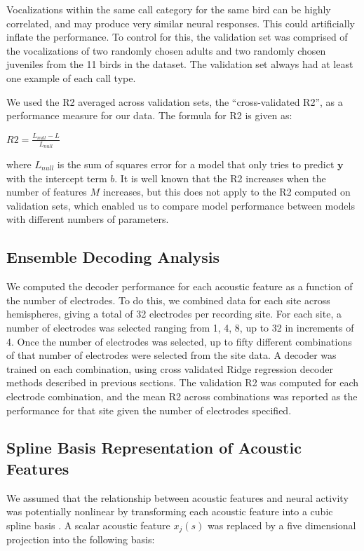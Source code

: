 Vocalizations within the same call category for the same bird can be highly correlated, and may produce very similar neural responses. This could artificially inflate the performance. To control for this, the validation set was comprised of the vocalizations of two randomly chosen adults and two randomly chosen juveniles from the 11 birds in the dataset. The validation set always had at least one example of each call type.

We used the R2 averaged across validation sets, the ``cross-validated R2'', as a performance measure for our data. The formula for R2 is given as:

\begin{center}
$R2 = \frac{L_{null}-L}{L_{null}}$
\end{center}

where $L_{null}$ is the sum of squares error for a model that only tries to predict $\textbf{y}$ with the intercept term $b$. It is well known that the R2 increases when the number of features $M$ increases, but this does not apply to the R2 computed on validation sets, which enabled us to compare model performance between models with different numbers of parameters.


\subsection{Ensemble Decoding Analysis}

We computed the decoder performance for each acoustic feature as a function of the number of electrodes. To do this, we combined data for each site across hemispheres, giving a total of 32 electrodes per recording site. For each site, a number of electrodes was selected ranging from 1, 4, 8, up to 32 in increments of 4. Once the number of electrodes was selected, up to fifty different combinations of that number of electrodes were selected from the site data. A decoder was trained on each combination, using cross validated Ridge regression decoder methods described in previous sections. The validation R2 was computed for each electrode combination, and the mean R2 across combinations was reported as the performance for that site given the number of electrodes specified.

\subsection{Spline Basis Representation of Acoustic Features}

We assumed that the relationship between acoustic features and neural activity was potentially nonlinear by transforming each acoustic feature into a cubic spline basis \cite{Friedman2009}. A scalar acoustic feature $x_j (s)$ was replaced by a five dimensional projection into the following basis:

